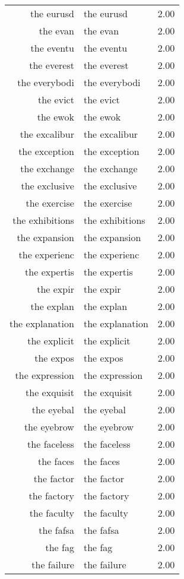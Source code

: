 \begin{table}[ht]
\begin{tabular}{rlr}
  the eurusd & the eurusd & 2.00 \\ 
  the evan & the evan & 2.00 \\ 
  the eventu & the eventu & 2.00 \\ 
  the everest & the everest & 2.00 \\ 
  the everybodi & the everybodi & 2.00 \\ 
  the evict & the evict & 2.00 \\ 
  the ewok & the ewok & 2.00 \\ 
  the excalibur & the excalibur & 2.00 \\ 
  the exception & the exception & 2.00 \\ 
  the exchange & the exchange & 2.00 \\ 
  the exclusive & the exclusive & 2.00 \\ 
  the exercise & the exercise & 2.00 \\ 
  the exhibitions & the exhibitions & 2.00 \\ 
  the expansion & the expansion & 2.00 \\ 
  the experienc & the experienc & 2.00 \\ 
  the expertis & the expertis & 2.00 \\ 
  the expir & the expir & 2.00 \\ 
  the explan & the explan & 2.00 \\ 
  the explanation & the explanation & 2.00 \\ 
  the explicit & the explicit & 2.00 \\ 
  the expos & the expos & 2.00 \\ 
  the expression & the expression & 2.00 \\ 
  the exquisit & the exquisit & 2.00 \\ 
  the eyebal & the eyebal & 2.00 \\ 
  the eyebrow & the eyebrow & 2.00 \\ 
  the faceless & the faceless & 2.00 \\ 
  the faces & the faces & 2.00 \\ 
  the factor & the factor & 2.00 \\ 
  the factory & the factory & 2.00 \\ 
  the faculty & the faculty & 2.00 \\ 
  the fafsa & the fafsa & 2.00 \\ 
  the fag & the fag & 2.00 \\ 
  the failure & the failure & 2.00 \\ 

\end{tabular}
\end{table}
